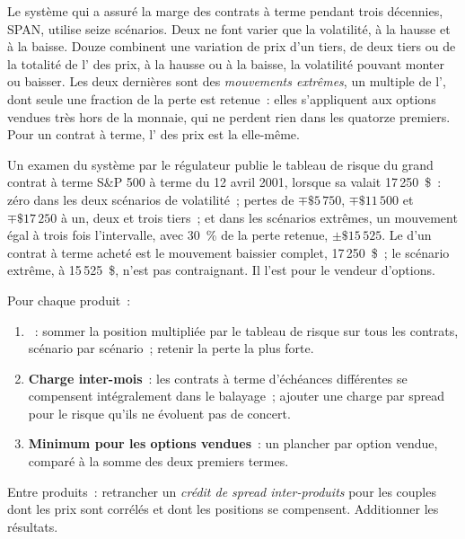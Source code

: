 Le système qui a assuré la marge des contrats à terme pendant trois décennies, SPAN, utilise
seize scénarios. Deux ne font varier que la volatilité, à la hausse et à la baisse. Douze combinent une
variation de prix d'un tiers, de deux tiers ou de la totalité de l' des prix, à la hausse
ou à la baisse, la volatilité pouvant monter ou baisser. Les deux dernières sont des \emph{mouvements extrêmes}, un
multiple de l', dont seule une fraction de la perte est retenue~:
elles s'appliquent aux options vendues très hors de la monnaie, qui ne perdent rien dans les
quatorze premiers. Pour un contrat à terme, l' des prix est la  elle-même.

\begin{example}\label{ex:m1:margin:array}
Un examen du système par le régulateur publie le tableau de risque du grand contrat à terme S\&P 500
à terme du 12 avril 2001, lorsque sa  valait 17\,250~\$~: zéro dans
les deux scénarios de volatilité~; pertes de $\mp\$5\,750$, $\mp\$11\,500$ et
$\mp\$17\,250$ à un, deux et trois tiers~; et dans les scénarios extrêmes, un
mouvement égal à trois fois l'intervalle, avec 30~\% de la perte retenue, $\pm\$15\,525$. Le
 d'un contrat à terme acheté est le mouvement baissier complet, 17\,250~\$~; le
scénario extrême, à 15\,525~\$, n'est pas contraignant. Il l'est pour le vendeur d'options.
\end{example}

\begin{method}\label{met:m1:margin:span}
Pour chaque produit~:
\begin{enumerate}
\item \textbf{}~: sommer la position multipliée par le tableau de risque sur tous les contrats,
scénario par scénario~; retenir la perte la plus forte.
\item \textbf{Charge inter-mois}~: les contrats à terme d'échéances différentes se compensent
intégralement dans le balayage~; ajouter une charge par spread pour le risque qu'ils ne
évoluent pas de concert.
\item \textbf{Minimum pour les options vendues}~: un plancher par option vendue, comparé à
la somme des deux premiers termes.
\end{enumerate}
Entre produits~: retrancher un \emph{crédit de spread
inter-produits} pour les couples dont les prix sont
corrélés et dont les positions se compensent. Additionner les résultats.
\end{method}

